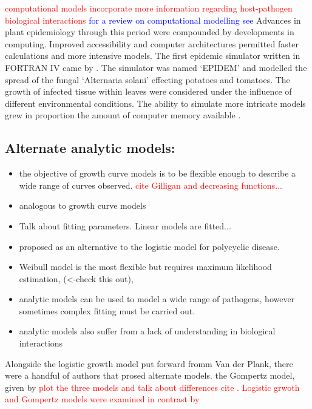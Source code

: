 \textcolor{red}{computational models incorporate more information regarding host-pathogen biological interactions} \textcolor{blue}{for a review on computational modelling see \cite{doi:10.1146/annurev.py.23.090185.002031}} Advances in plant epidemiology through this period were compounded by developments in computing. Improved accessibility and computer architectures permitted faster calculations and more intensive models. The first epidemic simulator written in FORTRAN IV came by \cite{waggoner1969epidem}. The simulator was named `EPIDEM' and modelled the spread of the fungal `Alternaria solani' effecting potatoes and tomatoes. The growth of infected tissue within leaves were considered under the influence of different environmental conditions. The ability to simulate more intricate models grew in proportion the amount of computer memory available \cite{zadoks1972methodology}.

\subsection{Alternate analytic models:}
\begin{itemize}
    \item the objective of growth curve models is to be flexible enough to describe a wide range of curves observed. \textcolor{red}{cite Gilligan and decreasing functions...}
    \item analogous to growth curve models 
    \item Talk about fitting parameters. Linear models are fitted... 
    \item proposed as an alternative to the logistic model for polycyclic disease. \cite{doi:10.1146/annurev.py.21.090183.000401}
    \item Weibull model is the most flexible but requires maximum likelihood estimation, (<-check this out), 
    \item analytic models can be used to model a wide range of pathogens, however sometimes complex fitting must be carried out.
    \item analytic models also suffer from a lack of understanding in biological interactions
\end{itemize}

Alongside the logistic growth model put forward fromm Van der Plank, there were a handful of authors that prosed alternate models. the Gompertz model, given by 
\textcolor{red}{plot the three models and talk about differences cite \cite{madden1980quantification}. Logistic grwoth and Gompertz models were examined in contrast by \cite{berger1981comparison}}


